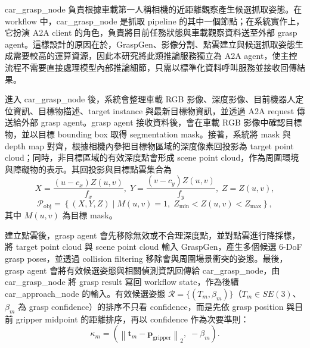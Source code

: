 \documentclass[12pt,a4paper]{article}
\makeatletter
\renewcommand\paragraph{\@startsection{paragraph}{4}{\z@}{1.3em}{0.5em}{\normalsize\bfseries}}
\makeatother
\begin{document}
\paragraph{car\_grasp\_node}
car\_grasp\_node 負責根據車載第一人稱相機的近距離觀察產生候選抓取姿態。在 workflow 中，car\_grasp\_node 是抓取 pipeline 的其中一個節點；在系統實作上，它扮演 A2A client 的角色，負責將目前任務狀態與車載觀察資料送至外部 grasp agent。這樣設計的原因在於，GraspGen、影像分割、點雲建立與候選抓取姿態生成需要較高的運算資源，因此本研究將此類推論服務獨立為 A2A agent，使主控流程不需要直接處理模型內部推論細節，只需以標準化資料呼叫服務並接收回傳結果。

進入 car\_grasp\_node 後，系統會整理車載 RGB 影像、深度影像、目前機器人定位資訊、目標物描述、target instance 與最新目標物資訊，並透過 A2A request 傳送給外部 grasp agent。grasp agent 接收資料後，會在車載 RGB 影像中確認目標物，並以目標 bounding box 取得 segmentation mask。接著，系統將 mask 與 depth map 對齊，根據相機內參把目標物區域的深度像素回投影為 target point cloud；同時，非目標區域的有效深度點會形成 scene point cloud，作為周圍環境與障礙物的表示。其回投影與目標點雲集合為
\begin{equation}
    X=\frac{(u-c_x)Z(u,v)}{f_x},\;
    Y=\frac{(v-c_y)Z(u,v)}{f_y},\;
    Z=Z(u,v),
\end{equation}
\begin{equation}
    \mathcal{P}_{\mathrm{obj}}=
    \left\{(X,Y,Z)\mid M(u,v)=1,\;Z_{\min}<Z(u,v)<Z_{\max}\right\},
\end{equation}
其中 $M(u,v)$ 為目標 mask。

建立點雲後，grasp agent 會先移除無效或不合理深度點，並對點雲進行降採樣，將 target point cloud 與 scene point cloud 輸入 GraspGen，產生多個候選 6-DoF grasp poses，並透過 collision filtering 移除會與周圍場景衝突的姿態。最後，grasp agent 會將有效候選姿態與相關偵測資訊回傳給 car\_grasp\_node，由 car\_grasp\_node 將 grasp result 寫回 workflow state，作為後續 car\_approach\_node 的輸入。有效候選姿態 $\mathcal{R}=\{(T_m,\beta_m)\}$（$T_m\in SE(3)$、$\beta_m$ 為 grasp confidence）的排序不只看 confidence，而是先依 grasp position 與目前 gripper midpoint 的距離排序，再以 confidence 作為次要準則：
\begin{equation}
    \kappa_m=\left(\left\lVert \mathbf{t}_m-\mathbf{p}_{\mathrm{gripper}}\right\rVert_2,\;-\beta_m\right).
\end{equation}
\end{document}
